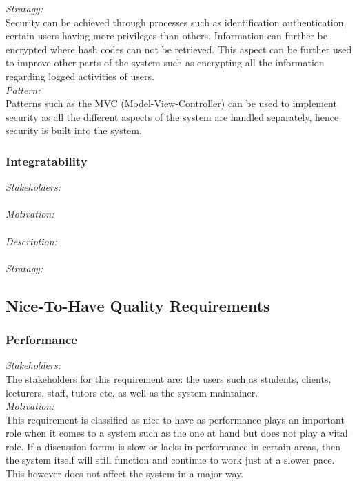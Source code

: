 \documentclass[a4paper,12pt]{report}
\begin{document}
		\emph{Stratagy: }\\ Security can be achieved through processes such as identification authentication, certain users having more privileges than others. Information can further be encrypted where hash codes can not be retrieved. This aspect can be further used to improve other parts of the system such as encrypting all the information regarding logged activities of users.\\
		
		\emph{Pattern: } \\ Patterns such as the MVC (Model-View-Controller) can be used to implement security as all the different aspects of the system are handled separately, hence security is built into the system.\\
			
			
		\subsubsection{Integratability}
		\emph{Stakeholders: }\\
		\\\emph{Motivation: }\\
		\\\emph{Description: }\\
		\\\emph{Stratagy: }\\
		
	\subsection{Nice-To-Have Quality Requirements}
		\subsubsection{Performance}
		\emph{Stakeholders: }\\ The stakeholders for this requirement are: the users such as students, clients, lecturers, staff, tutors etc, as well as the system maintainer.\\
		
		\emph{Motivation: }\\ This requirement is classified as nice-to-have  as performance plays an important role when it comes to a system such as the one at hand but does not play a vital role. If a discussion forum is slow or lacks in performance in certain areas, then the system itself will still function and continue to work just at a slower pace. This however does not affect the system in a major way.	\\
		
\end{document}
